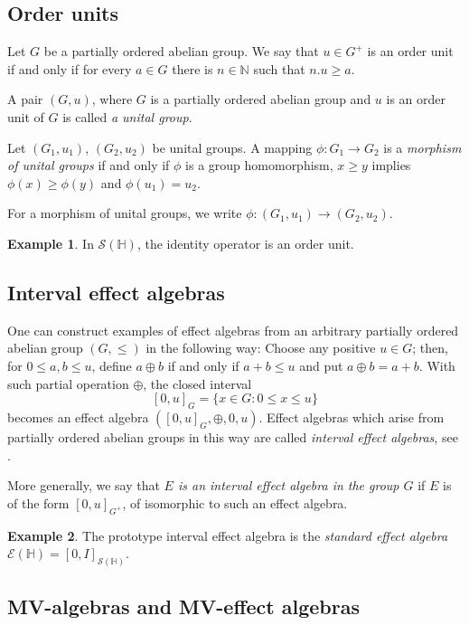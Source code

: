 \documentclass[letterpaper]{amsart}
\theoremstyle{definition}
\newtheorem{example}{Example}
\begin{document}
\subsection{Order units}

Let $G$ be a partially ordered abelian group.
We say that $u\in G^+$ is an order unit if and only if for every $a\in G$ there is
$n\in\mathbb N$ such that $n.u\geq a$. 

A pair $(G,u)$, where $G$ is a partially ordered abelian group and $u$ 
is an order unit of $G$ is called {\em a unital group}.

Let $(G_1,u_1)$, $(G_2,u_2)$ be unital groups. A mapping $\phi:G_1\to G_2$ is
a {\em morphism of unital groups} if and only if  $\phi$ is a group homomorphism,
$x\geq y$ implies $\phi(x)\geq\phi(y)$ and $\phi(u_1)=u_2$.

For a morphism of unital groups, we write $\phi:(G_1,u_1)\to(G_2,u_2)$.

\begin{example}
In $\mathcal S(\mathbb H)$, the identity operator is
an order unit.
\end{example}

\subsection{Interval effect algebras}

One can construct examples of effect algebras from an arbitrary partially
ordered abelian group $(G,\leq)$ in the following way: Choose any positive
$u\in G$; then, for $0\leq a,b\leq u$, define $a\oplus b$ if and only if
$a+b\leq u$ and put $a\oplus b=a+b$.  With such partial operation $\oplus$, the
closed interval 
$$
[0,u]_G=\{x\in G:0\leq x\leq u\}
$$ 
becomes an effect algebra $([0,u]_G,\oplus,0,u)$.  Effect
algebras which arise from partially ordered abelian groups in this way are
called {\em interval effect algebras}, see \cite{BenFou:IaSEA}.

More generally, we say that {\em $E$ is an interval effect algebra in the
group $G$} if $E$ is of the form $[0,u]_{G^+}$, of isomorphic to such 
an effect algebra.

\begin{example}
The prototype interval effect algebra is 
the {\em standard effect algebra}
$\mathcal E(\mathbb H)=[0,I]_{\mathcal S(\mathbb H)}$.
\end{example}

\subsection{MV-algebras and MV-effect algebras}
\end{document}
